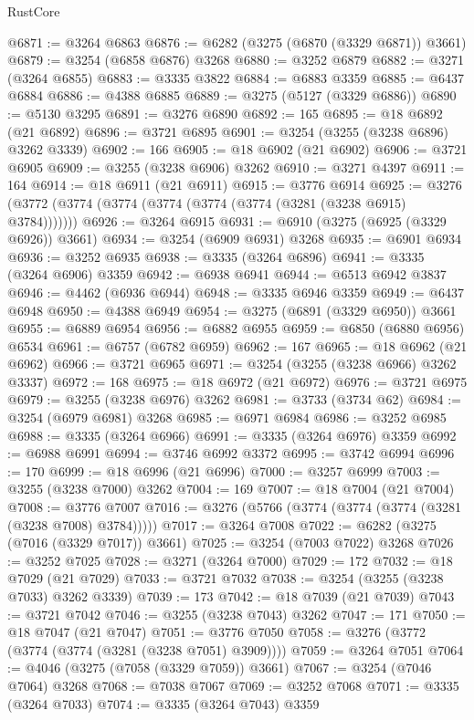\begin{lexlean}{RustCore}
\begin{coremodule}
@6871 := @3264 @6863
@6876 := @6282 (@3275 (@6870 (@3329 @6871)) @3661)
@6879 := @3254 (@6858 @6876) @3268
@6880 := @3252 @6879
@6882 := @3271 (@3264 @6855)
@6883 := @3335 @3822
@6884 := @6883 @3359
@6885 := @6437 @6884
@6886 := @4388 @6885
@6889 := @3275 (@5127 (@3329 @6886))
@6890 := @5130 @3295
@6891 := @3276 @6890
@6892 := 165
@6895 := @18 @6892 (@21 @6892)
@6896 := @3721 @6895
@6901 := @3254 (@3255 (@3238 @6896) @3262 @3339)
@6902 := 166
@6905 := @18 @6902 (@21 @6902)
@6906 := @3721 @6905
@6909 := @3255 (@3238 @6906) @3262
@6910 := @3271 @4397
@6911 := 164
@6914 := @18 @6911 (@21 @6911)
@6915 := @3776 @6914
@6925 := @3276 (@3772 (@3774 (@3774 (@3774 (@3774 (@3774 (@3281 (@3238 @6915) @3784)))))))
@6926 := @3264 @6915
@6931 := @6910 (@3275 (@6925 (@3329 @6926)) @3661)
@6934 := @3254 (@6909 @6931) @3268
@6935 := @6901 @6934
@6936 := @3252 @6935
@6938 := @3335 (@3264 @6896)
@6941 := @3335 (@3264 @6906) @3359
@6942 := @6938 @6941
@6944 := @6513 @6942 @3837
@6946 := @4462 (@6936 @6944)
@6948 := @3335 @6946 @3359
@6949 := @6437 @6948
@6950 := @4388 @6949
@6954 := @3275 (@6891 (@3329 @6950)) @3661
@6955 := @6889 @6954
@6956 := @6882 @6955
@6959 := @6850 (@6880 @6956) @6534
@6961 := @6757 (@6782 @6959)
@6962 := 167
@6965 := @18 @6962 (@21 @6962)
@6966 := @3721 @6965
@6971 := @3254 (@3255 (@3238 @6966) @3262 @3337)
@6972 := 168
@6975 := @18 @6972 (@21 @6972)
@6976 := @3721 @6975
@6979 := @3255 (@3238 @6976) @3262
@6981 := @3733 (@3734 @62)
@6984 := @3254 (@6979 @6981) @3268
@6985 := @6971 @6984
@6986 := @3252 @6985
@6988 := @3335 (@3264 @6966)
@6991 := @3335 (@3264 @6976) @3359
@6992 := @6988 @6991
@6994 := @3746 @6992 @3372
@6995 := @3742 @6994
@6996 := 170
@6999 := @18 @6996 (@21 @6996)
@7000 := @3257 @6999
@7003 := @3255 (@3238 @7000) @3262
@7004 := 169
@7007 := @18 @7004 (@21 @7004)
@7008 := @3776 @7007
@7016 := @3276 (@5766 (@3774 (@3774 (@3774 (@3281 (@3238 @7008) @3784)))))
@7017 := @3264 @7008
@7022 := @6282 (@3275 (@7016 (@3329 @7017)) @3661)
@7025 := @3254 (@7003 @7022) @3268
@7026 := @3252 @7025
@7028 := @3271 (@3264 @7000)
@7029 := 172
@7032 := @18 @7029 (@21 @7029)
@7033 := @3721 @7032
@7038 := @3254 (@3255 (@3238 @7033) @3262 @3339)
@7039 := 173
@7042 := @18 @7039 (@21 @7039)
@7043 := @3721 @7042
@7046 := @3255 (@3238 @7043) @3262
@7047 := 171
@7050 := @18 @7047 (@21 @7047)
@7051 := @3776 @7050
@7058 := @3276 (@3772 (@3774 (@3774 (@3281 (@3238 @7051) @3909))))
@7059 := @3264 @7051
@7064 := @4046 (@3275 (@7058 (@3329 @7059)) @3661)
@7067 := @3254 (@7046 @7064) @3268
@7068 := @7038 @7067
@7069 := @3252 @7068
@7071 := @3335 (@3264 @7033)
@7074 := @3335 (@3264 @7043) @3359

\end{coremodule}
\end{lexlean}
